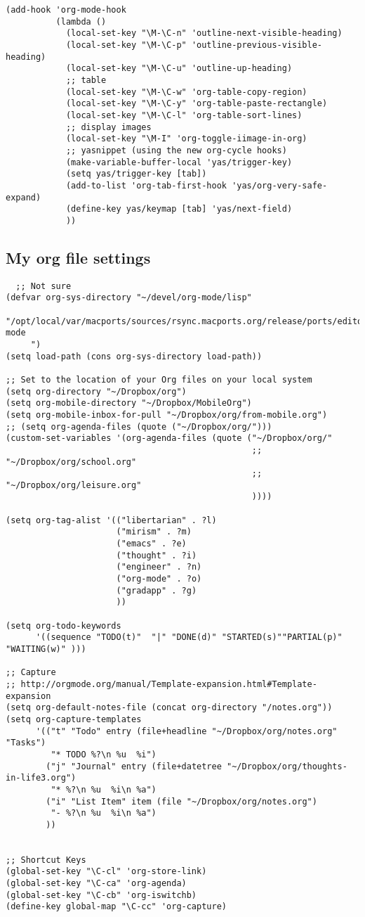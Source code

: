 \documentclass[11pt]{article}
\begin{document}
\begin{verbatim}
(add-hook 'org-mode-hook
          (lambda ()
            (local-set-key "\M-\C-n" 'outline-next-visible-heading)
            (local-set-key "\M-\C-p" 'outline-previous-visible-heading)
            (local-set-key "\M-\C-u" 'outline-up-heading)
            ;; table
            (local-set-key "\M-\C-w" 'org-table-copy-region)
            (local-set-key "\M-\C-y" 'org-table-paste-rectangle)
            (local-set-key "\M-\C-l" 'org-table-sort-lines)
            ;; display images
            (local-set-key "\M-I" 'org-toggle-iimage-in-org)
            ;; yasnippet (using the new org-cycle hooks)
            (make-variable-buffer-local 'yas/trigger-key)
            (setq yas/trigger-key [tab])
            (add-to-list 'org-tab-first-hook 'yas/org-very-safe-expand)
            (define-key yas/keymap [tab] 'yas/next-field)
            ))
\end{verbatim}
\subsection*{My org file settings}
\label{sec-1_3}

\begin{verbatim}
  ;; Not sure
(defvar org-sys-directory "~/devel/org-mode/lisp"
  "/opt/local/var/macports/sources/rsync.macports.org/release/ports/editors/org-mode 
     ")
(setq load-path (cons org-sys-directory load-path))

;; Set to the location of your Org files on your local system
(setq org-directory "~/Dropbox/org")
(setq org-mobile-directory "~/Dropbox/MobileOrg")
(setq org-mobile-inbox-for-pull "~/Dropbox/org/from-mobile.org")
;; (setq org-agenda-files (quote ("~/Dropbox/org/")))
(custom-set-variables '(org-agenda-files (quote ("~/Dropbox/org/"
                                                 ;; "~/Dropbox/org/school.org"
                                                 ;; "~/Dropbox/org/leisure.org"
                                                 ))))

(setq org-tag-alist '(("libertarian" . ?l)
                      ("mirism" . ?m)
                      ("emacs" . ?e)
                      ("thought" . ?i)
                      ("engineer" . ?n)
                      ("org-mode" . ?o)
                      ("gradapp" . ?g)
                      ))

(setq org-todo-keywords
      '((sequence "TODO(t)"  "|" "DONE(d)" "STARTED(s)""PARTIAL(p)" "WAITING(w)" )))

;; Capture
;; http://orgmode.org/manual/Template-expansion.html#Template-expansion
(setq org-default-notes-file (concat org-directory "/notes.org"))
(setq org-capture-templates
      '(("t" "Todo" entry (file+headline "~/Dropbox/org/notes.org" "Tasks")
         "* TODO %?\n %u  %i")
        ("j" "Journal" entry (file+datetree "~/Dropbox/org/thoughts-in-life3.org")
         "* %?\n %u  %i\n %a")
        ("i" "List Item" item (file "~/Dropbox/org/notes.org")
         "- %?\n %u  %i\n %a")
        ))


;; Shortcut Keys
(global-set-key "\C-cl" 'org-store-link)
(global-set-key "\C-ca" 'org-agenda)
(global-set-key "\C-cb" 'org-iswitchb)
(define-key global-map "\C-cc" 'org-capture)
\end{verbatim}
\end{document}

